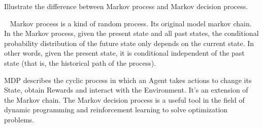 \begin{exercise}[]{Illustrate the difference between Markov process and Markov decision process.}
  \begin{solution}
  \par{~}
  Markov process is a kind of random process. Its original model markov chain. In the Markov process, given the present state and all past states, the conditional probability distribution of the future state only depends on the current state. In other words, given the present state, it is conditional independent of the past state (that is, the historical path of the process).

  MDP describes the cyclic process in which an Agent takes actions to change its State, obtain Rewards and interact with the Environment. It's an extension of the Markov chain.
  The Markov decision process is a useful tool in the field of dynamic programming and reinforcement learning to solve optimization problems.

  \end{solution}
  \label{ex1}
\end{exercise}


